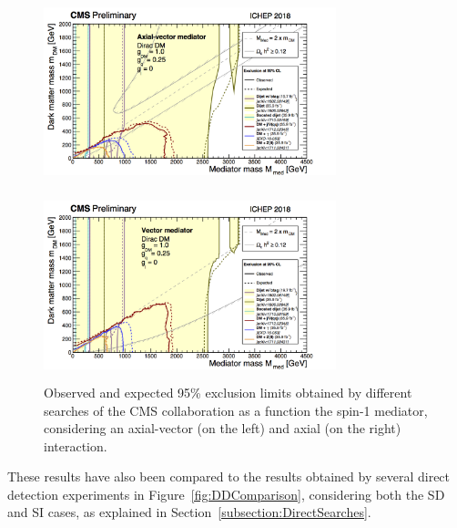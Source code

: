 \documentclass[a4paper, 10pt, openright]{report}
\begin{document}
\begin{figure}[htbp]
\centering
\begin{minipage}[b]{.47\textwidth}
\includegraphics[width=8.5cm, height=5.5cm]{figs/SummaryAxialVector.png}
\end{minipage}\hfill
\begin{minipage}[b]{.47\textwidth}
\includegraphics[width=8.5cm, height=5.5cm]{figs/SummaryVector.png}
\end{minipage} \hfill
\caption{Observed and expected 95\% exclusion limits obtained by different searches of the \ac{CMS} collaboration as a function the spin-1 mediator, considering an axial-vector (on the left) and axial (on the right) interaction.}
\label{fig:SummarySpin1}
\end{figure}

These results have also been compared to the results obtained by several direct detection experiments in Figure~\ref{fig:DDComparison}, considering both the \acf{SD} and \acf{SI} cases, as explained in Section~\ref{subsection:DirectSearches}.
\end{document}
